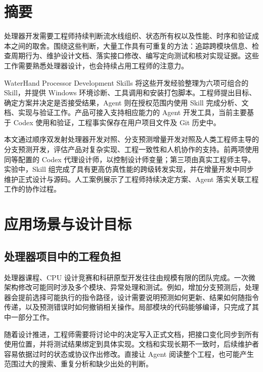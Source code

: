 \documentclass[UTF8,fontset=none,zihao=-4,a4paper]{ctexart}
\begin{document}
\hypersetup{pageanchor=false}
\CoverPage
{}
\hypersetup{pageanchor=true}
\thispagestyle{plain}
\begingroup
\small
{}
\tableofcontents
\endgroup
\clearpage
{}
\section*{摘要}

处理器开发需要工程师持续判断流水线组织、状态所有权以及性能、时序和验证成本之间的取舍。围绕这些判断，大量工作具有可重复的方法：追踪跨模块信息、检查周期行为、维护设计文档、落实接口修改、编写定向测试和核对实现证据。这些工作需要熟悉处理器设计，也会持续占用工程师的注意力。

WaterHand Processor Development Skills 将这些开发经验整理为六项可组合的 Skill，并提供 Windows 环境诊断、工具调用和安装打包脚本。工程师提出目标、确定方案并决定是否接受结果，Agent 则在授权范围内使用 Skill 完成分析、文档、实现与验证工作。产品可接入支持相应能力的 Agent 开发工具，当前主要基于 Codex 使用和验证，工程事实保存在用户项目文件及 Git 历史中。

本文通过顺序双发射处理器开发对照、分支预测增量开发对照及人类工程师主导的分支预测开发，评估产品对复杂实现、工程一致性和人机协作的支持。前两项使用同等配置的 Codex 代理设计师，以控制设计师变量；第三项由真实工程师主导。实验中，Skill 组完成了具有更高仿真性能的跨级转发实现，并在增量开发中同步维护正式设计与源码。人工案例展示了工程师持续决定方案、Agent 落实关联工程工作的协作过程。

\section{应用场景与设计目标}

\subsection{处理器项目中的工程负担}

处理器课程、CPU 设计竞赛和科研原型开发往往由规模有限的团队完成。一次微架构修改可能同时涉及多个模块、异常处理和测试。例如，增加分支预测后，处理器会提前选择可能执行的指令路径，设计需要说明预测如何更新、结果如何随指令传递，以及预测错误时如何撤销相关操作。局部模块的代码能够编译，只完成了其中一部分工作。

随着设计推进，工程师需要将讨论中的决定写入正式文档，把接口变化同步到所有使用位置，并将测试结果绑定到具体实现。文档和实现长期不一致时，后续维护者容易依据过时的状态或协议作出修改。直接让 Agent 阅读整个工程，也可能产生范围过大的搜索、重复分析和缺少出处的判断。
\end{document}
